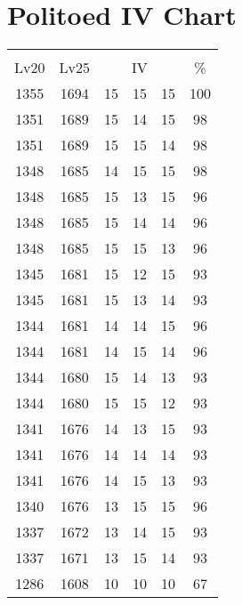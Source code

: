 \documentclass{article}%
\begin{document}
%
\normalsize%
\section{Politoed IV Chart}%
\label{sec:Politoed IV Chart}%
\renewcommand{\arraystretch}{1.5}%
\begin{tabular}{|c|c|c|c|c|c|}%
\hline%
\multicolumn{6}{|c|}{\textcolor{white}{ 
\linebreak{Politoed}
}%
\cellcolor{black}}\\%
\multicolumn{1}{|c}{Lv20}&\multicolumn{1}{c|}{Lv25}&\multicolumn{3}{c|}{IV}&\multicolumn{1}{|c|}{\%}\\%
\hline%
\rowcolor{color100}%
1355&1694&15&15&15&100\\%
\hline%
\rowcolor{color98}%
1351&1689&15&14&15&98\\%
\hline%
\rowcolor{color98}%
1351&1689&15&15&14&98\\%
\hline%
\rowcolor{color98}%
1348&1685&14&15&15&98\\%
\hline%
\rowcolor{color96}%
1348&1685&15&13&15&96\\%
\hline%
\rowcolor{color96}%
1348&1685&15&14&14&96\\%
\hline%
\rowcolor{color96}%
1348&1685&15&15&13&96\\%
\hline%
\rowcolor{color93}%
1345&1681&15&12&15&93\\%
\hline%
\rowcolor{color93}%
1345&1681&15&13&14&93\\%
\hline%
\rowcolor{color96}%
1344&1681&14&14&15&96\\%
\hline%
\rowcolor{color96}%
1344&1681&14&15&14&96\\%
\hline%
\rowcolor{color93}%
1344&1680&15&14&13&93\\%
\hline%
\rowcolor{color93}%
1344&1680&15&15&12&93\\%
\hline%
\rowcolor{color93}%
1341&1676&14&13&15&93\\%
\hline%
\rowcolor{color93}%
1341&1676&14&14&14&93\\%
\hline%
\rowcolor{color93}%
1341&1676&14&15&13&93\\%
\hline%
\rowcolor{color96}%
1340&1676&13&15&15&96\\%
\hline%
\rowcolor{color93}%
1337&1672&13&14&15&93\\%
\hline%
\rowcolor{color93}%
1337&1671&13&15&14&93\\%
\hline%
\rowcolor{color91}%
1286&1608&10&10&10&67\\%
\end{tabular}

%
\end{document}
